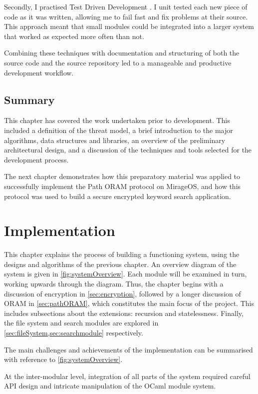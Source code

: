 \documentclass[12pt,a4paper,twoside,openright]{report}
\begin{document}
Secondly, I practised Test Driven Development \cite{hunt2004pragmatic}. I unit tested each new piece of code as it was written, allowing me to fail fast and fix problems at their source. This approach meant that small modules could be integrated into a larger system that worked as expected more often than not.

Combining these techniques with documentation and structuring of both the source code and the source repository led to a manageable and productive development workflow.

\section{Summary}

This chapter has covered the work undertaken prior to development. This included a definition of the threat model, a brief introduction to the major algorithms, data structures and libraries, an overview of the preliminary architectural design, and a discussion of the techniques and tools selected for the development process.

The next chapter demonstrates how this preparatory material was applied to successfully implement the Path ORAM protocol on MirageOS, and how this protocol was used to build a secure encrypted keyword search application.

\chapter{Implementation}

This chapter explains the process of building a functioning system, using the designs and algorithms of the previous chapter. An overview diagram of the system is given in \cref{fig:systemOverview}. Each module will be examined in turn, working upwards through the diagram. Thus, the chapter begins with a discussion of encryption in \cref{sec:encryption}, followed by a longer discussion of ORAM in \cref{sec:pathORAM}, which constitutes the main focus of the project. This includes subsections about the extensions: recursion and statelessness. Finally, the file system and search modules are explored in \cref{sec:fileSystem,sec:searchmodule} respectively.

The main challenges and achievements of the implementation can be summarised with reference to \cref{fig:systemOverview}.

At the inter-modular level, integration of all parts of the system required careful API design and intricate manipulation of the OCaml module system.
\end{document}
